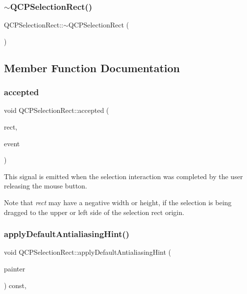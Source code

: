 \subsubsection{\texorpdfstring{$\sim$QCPSelectionRect()}{~QCPSelectionRect()}}
{\footnotesize\ttfamily Q\+C\+P\+Selection\+Rect\+::$\sim$\+Q\+C\+P\+Selection\+Rect (\begin{DoxyParamCaption}{ }\end{DoxyParamCaption})\hspace{0.3cm}{\ttfamily [virtual]}}



\subsection{Member Function Documentation}
\mbox{\label{class_q_c_p_selection_rect_a15a43542e1f7b953a44c260b419e6d2c}} 
\subsubsection{\texorpdfstring{accepted}{accepted}}
{\footnotesize\ttfamily void Q\+C\+P\+Selection\+Rect\+::accepted (\begin{DoxyParamCaption}\item[{const Q\+Rect \&}]{rect,  }\item[{Q\+Mouse\+Event $\ast$}]{event }\end{DoxyParamCaption})\hspace{0.3cm}{\ttfamily [signal]}}

This signal is emitted when the selection interaction was completed by the user releasing the mouse button.

Note that {\itshape rect} may have a negative width or height, if the selection is being dragged to the upper or left side of the selection rect origin. \mbox{\label{class_q_c_p_selection_rect_aa854697618e16037ba9c73056abfb9bf}} 
\subsubsection{\texorpdfstring{applyDefaultAntialiasingHint()}{applyDefaultAntialiasingHint()}}
{\footnotesize\ttfamily void Q\+C\+P\+Selection\+Rect\+::apply\+Default\+Antialiasing\+Hint (\begin{DoxyParamCaption}\item[{\mbox{\hyperlink{class_q_c_p_painter}{Q\+C\+P\+Painter}} $\ast$}]{painter }\end{DoxyParamCaption}) const\hspace{0.3cm}{\ttfamily [protected]}, {\ttfamily [virtual]}}



